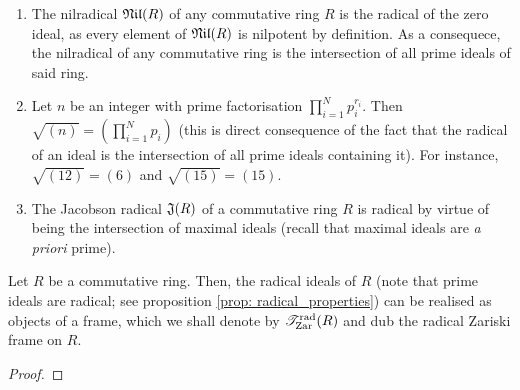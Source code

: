                 \begin{example}
                    \noindent
                    \begin{enumerate}
                        \item The nilradical $\mathfrak{Nil}(R)$ of any commutative ring $R$ is the radical of the zero ideal, as every element of $\mathfrak{Nil}(R)$ is nilpotent by definition. As a consequece, the nilradical of any commutative ring is the intersection of all prime ideals of said ring.
                        \item Let $n$ be an integer with prime factorisation $\prod_{i = 1}^N p_i^{r_i}$. Then $\sqrt{(n)} = \left(\prod_{i = 1}^N p_i\right)$ (this is direct consequence of the fact that the radical of an ideal is the intersection of all prime ideals containing it). For instance, $\sqrt{(12)} = (6)$ and $\sqrt{(15)} = (15)$. 
                        \item The Jacobson radical $\mathfrak{J}(R)$ of a commutative ring $R$ is radical by virtue of being the intersection of maximal ideals (recall that maximal ideals are \textit{a priori} prime).
                    \end{enumerate}
                \end{example}
                
                \begin{proposition} \label{prop: radical_frame}
                    Let $R$ be a commutative ring. Then, the radical ideals of $R$ (note that prime ideals are radical; see proposition \ref{prop: radical_properties}) can be realised as objects of a frame, which we shall denote by $\mathscr{T}_{\mathrm{Zar}}^{\mathrm{rad}}(R)$ and dub the radical Zariski frame on $R$.
                \end{proposition}
                    \begin{proof}
                        
                    \end{proof}
                
